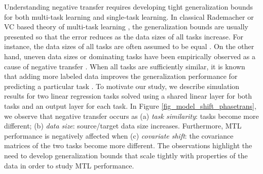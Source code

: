 Understanding negative transfer requires developing tight generalization bounds for both multi-task learning and single-task learning.
In classical Rademacher or VC based theory of multi-task learning \cite{B00,AZ05,M06}, the generalization bounds are usually presented so that the error reduces as the data sizes of all tasks increase.
For instance, the data sizes of all tasks are often assumed to be equal \cite{B00,LPTV09,LPVT11,MPR16}.
On the other hand, uneven data sizes or dominating tasks have been empirically observed as a cause of negative transfer \cite{YKGLHF20}.
When all tasks are sufficiently similar, it is known that adding more labeled data improves the generalization performance for predicting a particular task \cite{WZR20}.
To motivate our study, we describe simulation results for two linear regression tasks solved using a shared linear layer for both tasks and an output layer for each task.
In Figure \ref{fig_model_shift_phasetrans}, we observe that negative transfer occurs as (a) \textit{task similarity}: tasks become more different; (b) \textit{data size}: source/target data size increases.
Furthermore, MTL performance is negatively affected when (c) \textit{covariate shift}: the covariance matrices of the two tasks become more different.
The observations highlight the need to develop generalization bounds that scale tightly with properties of the data in order to study MTL performance.

